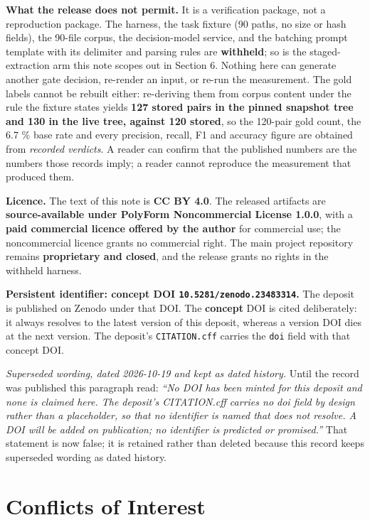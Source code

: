 \documentclass[11pt,a4paper]{article}
\begin{document}
\textbf{What the release does not permit.} It is a verification package, not a reproduction package. The harness, the task fixture (90 paths, no size or hash fields), the 90-file corpus, the decision-model service, and the batching prompt template with its delimiter and parsing rules are \textbf{withheld}; so is the staged-extraction arm this note scopes out in Section 6. Nothing here can generate another gate decision, re-render an input, or re-run the measurement. The gold labels cannot be rebuilt either: re-deriving them from corpus content under the rule the fixture states yields \textbf{127 stored pairs in the pinned snapshot tree and 130 in the live tree, against 120 stored}, so the 120-pair gold count, the 6.7 \% base rate and every precision, recall, F1 and accuracy figure are obtained from \emph{recorded verdicts}. A reader can confirm that the published numbers are the numbers those records imply; a reader cannot reproduce the measurement that produced them.

\textbf{Licence.} The text of this note is \textbf{CC BY 4.0}. The released artifacts are \textbf{source-available under PolyForm Noncommercial License 1.0.0}, with a \textbf{paid commercial licence offered by the author} for commercial use; the noncommercial licence grants no commercial right. The main project repository remains \textbf{proprietary and closed}, and the release grants no rights in the withheld harness.

\textbf{Persistent identifier: concept DOI \texttt{10.5281/zenodo.23483314}.} The deposit is published on Zenodo under that DOI. The \textbf{concept} DOI is cited deliberately: it always resolves to the latest version of this deposit, whereas a version DOI dies at the next version. The deposit's \texttt{CITATION.cff} carries the \texttt{doi} field with that concept DOI.

\emph{Superseded wording, dated 2026-10-19 and kept as dated history.} Until the record was published this paragraph read: \emph{``No DOI has been minted for this deposit and none is claimed here. The deposit's CITATION.cff carries no doi field by design rather than a placeholder, so that no identifier is named that does not resolve. A DOI will be added on publication; no identifier is predicted or promised.''} That statement is now false; it is retained rather than deleted because this record keeps superseded wording as dated history.

\section*{Conflicts of Interest}
\end{document}
